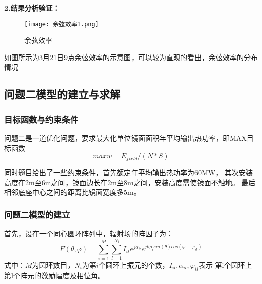 \documentclass{数学建模}
\begin{document}
\begin{center}
    \renewcommand{\arraystretch}{1.5}
    \begin{table}[htbp]
        \centering
        \caption{问题一年平均光学效率及输出功率表}
        \label{tab:example}
      \end{table}
\end{center}

\textbf{2.结果分析验证：}
\begin{figure}[H]  
    \centering\texttt{[image: 余弦效率1.png]}  
    \caption{余弦效率}     
    \label{img01}  
\end{figure}

如图所示为3月21日9点余弦效率的示意图，可以较为直观的看出，余弦效率的分布情况


\subsection{问题二模型的建立与求解}

\subsubsection{目标函数与约束条件}

问题二是一道优化问题，要求最大化单位镜面面积年平均输出热功率，即MAX目标函数
\begin{equation}
    max w=E_{field}/(N*S)
\end{equation}


同时题目给出了一些约束条件，首先额定年平均输出热功率为60MW，
其次安装高度在2m至6m之间，镜面边长在2m至8m之间，安装高度需使镜面不触地。
最后相邻底座中心之间的距离比镜面宽度多5m。




\subsubsection{问题二模型的建立}

首先，设在一个同心圆环阵列中，辐射场的阵因子为：
\begin{equation}
    F(\theta ,\varphi ) = \sum_{i = 1}^{M} \sum_{l = 1}^{N_i}
    I_{il}e^{j\alpha_{il}}e^{jk\rho_i sin(\theta )cos(\varphi -\varphi_{il})}  
\end{equation}
式中：$M$为圆环数目，$N_i$为第$i$个圆环上振元的个数，$I_{il},\alpha_{il},\varphi_{il}$表示
第i个圆环上第l个阵元的激励幅度及相位角。
\end{document}
